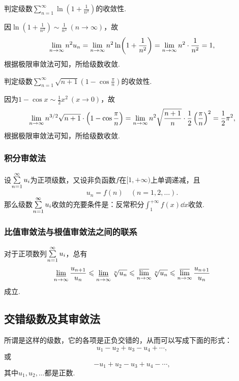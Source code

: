 \begin{example}
\def\s{\sum\limits_{n=1}^{\infty}}
判定级数\(\s \ln(1+\frac{1}{n^2})\)的收敛性.
\begin{solution}
因\(\ln(1+\frac{1}{n^2}) \sim \frac{1}{n^2}\ (n\to\infty)\)，故\[
\lim\limits_{n\to\infty} n^2 u_n = \lim\limits_{n\to\infty} n^2 \ln(1+\frac{1}{n^2})
= \lim\limits_{n\to\infty} n^2 \cdot \frac{1}{n^2} = 1,
\]根据极限审敛法可知，所给级数收敛.
\end{solution}
\end{example}

\begin{example}
\def\s{\sum\limits_{n=1}^{\infty}}
判定级数\(\s \sqrt{n+1} \left(1-\cos\frac{\pi}{n}\right)\)的收敛性.
\begin{solution}
因为\(1 - \cos x \sim \frac{1}{2} x^2\ (x\to0)\)，故\[
\lim\limits_{n\to\infty} n^{3/2} \sqrt{n+1} \cdot \left(1-\cos\frac{\pi}{n}\right)
= \lim\limits_{n\to\infty} n^2 \sqrt{\frac{n+1}{n}} \cdot \frac{1}{2} \left(\frac{\pi}{n}\right)^2
= \frac{1}{2} \pi^2,
\]根据极限审敛法可知，所给级数收敛.
\end{solution}
\end{example}

\subsubsection{积分审敛法}
\begin{theorem}[积分审敛法]\label{theorem:无穷级数.积分审敛法}
设\(\s u_i\)为正项级数，又设非负函数\(f\)在\([1,+\infty)\)上单调递减，且\[
u_n = f(n) \quad (n=1,2,\dotsc).
\]那么级数\(\s u_i\)收敛的充要条件是：反常积分\(\int_1^{+\infty} f(x) \dd{x}\)收敛.
\end{theorem}

\subsubsection{比值审敛法与根值审敛法之间的联系}
\begin{theorem}
对于正项数列\(\s u_i\)，总有\[
\varliminf\limits_{n\to\infty} \frac{u_{n+1}}{u_n}
\leqslant
\varliminf\limits_{n\to\infty} \sqrt[n]{u_n}
\leqslant
\varlimsup\limits_{n\to\infty} \sqrt[n]{u_n}
\leqslant
\varlimsup\limits_{n\to\infty} \frac{u_{n+1}}{u_n}
\]成立.
\end{theorem}

\subsection{交错级数及其审敛法}
所谓是这样的级数，它的各项是正负交错的，从而可以写成下面的形式：\[
u_1 - u_2 + u_3 - u_4 + \dotsb,
\]或\[
-u_1 + u_2 - u_3 + u_4 - \dotsb,
\]其中\(u_1,u_2,\dotsc\)都是正数.


